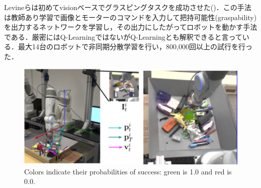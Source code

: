 Levineらは初めてvisionベースでグラスピングタスクを成功させた\cite{Levine2017}()．この手法は教師あり学習で画像とモーターのコマンドを入力して把持可能性(graspability)を出力するネットワークを学習し，その出力にしたがってロボットを動かす手法である．厳密にはQ-LearningではないがQ-Learningとも解釈できると言っている．最大14台のロボットで非同期分散学習を行い，800,000回以上の試行を行った．
\begin{figure}
\centering
\includegraphics[width=\linewidth]{figure/chapter2/Levine_grasp}
\caption[Colors indicate their probabilities of success: green is 1.0 and red is 0.0]{Colors indicate their probabilities of success: green is 1.0 and red is 0.0\cite{Levine2017}.}
\label{fig:Levine}
\end{figure}
